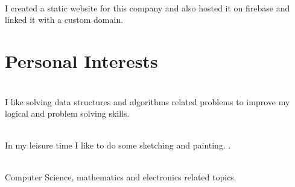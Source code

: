 \documentclass[]{deedy-resume-openfont}
\begin{document}
         
       
           \hfill {}\\
           I created a static website for this company and also hosted it on firebase and linked it with a custom domain.\\
           \sectionsep

       \section{Personal Interests}
       \raggedright
         
                             \\
            I like solving data structures and algorithms related problems to improve my logical and problem solving skills. 
           \sectionsep
       
       
           \\
            In my leisure time I like to do some sketching and painting. .\\
           \sectionsep
         
       
           \\
            Computer Science, mathematics and electronics related topics.\\
           \sectionsep



     \ 
     
\end{document}
